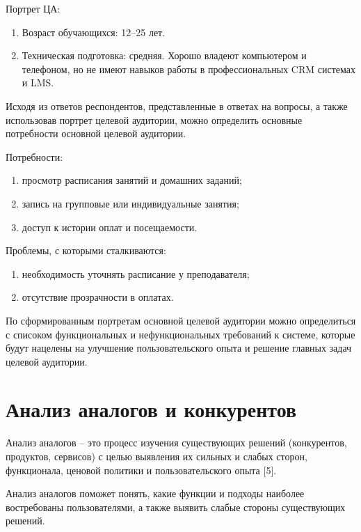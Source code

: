 \documentclass[a4paper,14pt,oneside]{extreport}
\begin{document}
Портрет ЦА:

\begin{enumerate}
    \item Возраст обучающихся: 12–25 лет.
    \item Техническая подготовка: средняя. Хорошо владеют компьютером и телефоном, но не имеют навыков работы в профессиональных CRM системах и LMS.
\end{enumerate}

Исходя из ответов респондентов, представленные в ответах на вопросы, а также использовав портрет целевой аудитории, можно определить основные потребности основной целевой аудитории.

Потребности:

\begin{enumerate}[label=\arabic*)]
    \item просмотр расписания занятий и домашних заданий;
    \item запись на групповые или индивидуальные занятия;
    \item доступ к истории оплат и посещаемости.
\end{enumerate}

Проблемы, с которыми сталкиваются:

\begin{enumerate}[label=\arabic*)]
    \item необходимость уточнять расписание у преподавателя;
    \item отсутствие прозрачности в оплатах.
\end{enumerate}

По сформированным портретам основной целевой аудитории можно определиться с списоком функциональных и нефункциональных требований к системе, которые будут нацелены на улучшение пользовательского опыта и решение главных задач целевой аудитории.


\section{Анализ аналогов и конкурентов}

Анализ аналогов – это процесс изучения существующих решений (конкурентов, продуктов, сервисов) с целью выявления их сильных и слабых сторон, функционала, ценовой политики и пользовательского опыта [5].

Анализ аналогов поможет понять, какие функции и подходы наиболее востребованы пользователями, а также выявить слабые стороны существующих решений. 
\end{document}
